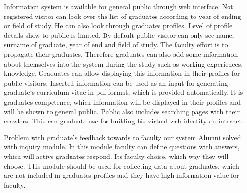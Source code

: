 \documentclass{iitsrc}[2006/14/02]
\begin{document}
Information system is available for general public through web interface. Not registered visitor can look over the list of graduates according to year of ending or field of study. He can also look through graduates profiles. Level of profile details show to public is limited. By default public visitor can only see name, surname of graduate, year of end and field of study. The faculty effort is to propagate their graduates. Therefore graduates can also add some information about themselves into the system during the study such as working experiences, knowledge. Graduates can allow displaying this information in their profiles for public visitors. Inserted information can be used as an input for generating graduate`s curriculum vitae in pdf format, which is provided automatically. It is graduates competence, which information will be displayed in their profiles and will be shown to general public. Public also includes searching pages with their crawlers. This can graduate use for building his virtual web identity on internet. 

Problem with graduate’s feedback towards to faculty our system Alumni solved with inquiry module. In this module faculty can define questions with answers, which will active graduates respond. Its faculty choice, which way they will choose. This module should be used for collecting data about graduates, which are not included in graduates profiles and they have high information value for faculty.

  

\nocite{team14}
\nocite{team15}
\nocite{cakephp}



\end{document}
